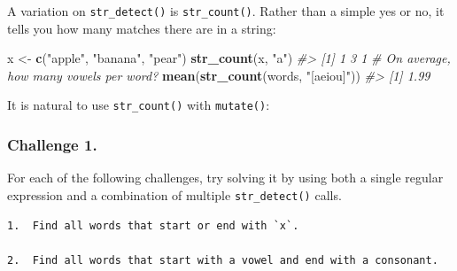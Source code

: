 \documentclass[
]{book}
\newenvironment{Shaded}{\begin{snugshade}}{\end{snugshade}}
\newcommand{\CommentTok}[1]{\textcolor[rgb]{0.56,0.35,0.01}{\textit{#1}}}
\newcommand{\DataTypeTok}[1]{\textcolor[rgb]{0.13,0.29,0.53}{#1}}
\newcommand{\KeywordTok}[1]{\textcolor[rgb]{0.13,0.29,0.53}{\textbf{#1}}}
\newcommand{\NormalTok}[1]{#1}
\newcommand{\OperatorTok}[1]{\textcolor[rgb]{0.81,0.36,0.00}{\textbf{#1}}}
\newcommand{\StringTok}[1]{\textcolor[rgb]{0.31,0.60,0.02}{#1}}
\begin{document}
A variation on \texttt{str\_detect()} is \texttt{str\_count()}. Rather than a simple yes or no, it tells you how many matches there are in a string:

\begin{Shaded}
\begin{Highlighting}[]
\NormalTok{x <-}\StringTok{ }\KeywordTok{c}\NormalTok{(}\StringTok{"apple"}\NormalTok{, }\StringTok{"banana"}\NormalTok{, }\StringTok{"pear"}\NormalTok{)}
\KeywordTok{str_count}\NormalTok{(x, }\StringTok{"a"}\NormalTok{)}
\CommentTok{#> [1] 1 3 1}
\CommentTok{# On average, how many vowels per word?}
\KeywordTok{mean}\NormalTok{(}\KeywordTok{str_count}\NormalTok{(words, }\StringTok{"[aeiou]"}\NormalTok{))}
\CommentTok{#> [1] 1.99}
\end{Highlighting}
\end{Shaded}

It is natural to use \texttt{str\_count()} with \texttt{mutate()}:

\begin{Shaded}
\end{Shaded}

\hypertarget{challenge-1.-13}{%
\subsubsection*{Challenge 1.}\label{challenge-1.-13}}

For each of the following challenges, try solving it by using both a single regular expression and a combination of multiple \texttt{str\_detect()} calls.

\begin{verbatim}
1.  Find all words that start or end with `x`.

2.  Find all words that start with a vowel and end with a consonant.
\end{verbatim}
\end{document}
